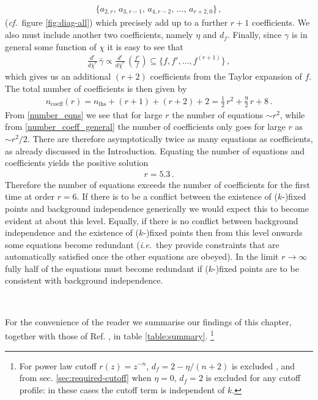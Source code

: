 \documentclass[11pt]{book} %
\newcommand\ie{\textit{i.e.}\ }
\newcommand\cf{\textit{cf.}\ }
\numberwithin{equation}{chapter}
\begin{document}
\begin{align}
  \bigg\lbrace
  a_{2,r},\, a_{3,r-1},\, a_{4,r-2},\, \dots,\, a_{r+2,0}
  \bigg\rbrace \,,
\end{align}
(\cf figure \ref{fig:diag-all}) which precisely add up to a further $r+1$ coefficients.
We also must include another two coefficients, namely $\eta$ and $d_f$.
Finally, since $\gamma$ is in general some function of $\chi$ it is easy to see that
\begin{align}
  \frac{d^r}{d \bar\chi^r} \, \bar{\gamma} \propto \frac{d^r}{d \bar\chi^r} \, \left( \frac{f'}{f}\right) \subseteq
  \bigg\lbrace f, f', \dots, f^{(r+1)}   \bigg\rbrace \,,
\end{align}
which gives us an additional $(r+2)$ coefficients from the Taylor expansion of $f$.
The total number of coefficients is then given by
\begin{align}
  \label{number_coeff_general}
  n_{\text{coeff}}(r) = n_{\text{lhs}} + (r+1) + (r+2) + 2  = \frac{1}{2} \, r^2 + \frac{9}{2} \, r + 8 \,.
\end{align}
From \eqref{number_eqns} we see that for large $r$ the number of equations $\sim r^2$,
while from \eqref{number_coeff_general} the number of coefficients only goes for large $r$ as $\sim r^2/2$.
There are therefore asymptotically twice as many equations as coefficients,
as already discussed in the Introduction.
Equating the number of equations and coefficients yields the positive solution
\begin{align}
  r = 5.3 \,.
\end{align}
Therefore the number of equations exceeds the number of coefficients for the first time at order $r=6$.
If there is to be a conflict between the existence of ($k$-)fixed points and background independence
generically we would expect this to become evident at about this level.
Equally, if there is no conflict between background independence and the existence of ($k$-)fixed points
then from this level onwards some equations become redundant
(\ie they provide constraints that are automatically satisfied once the other equations are obeyed).
In the limit $r\to\infty$ fully half of the equations must become redundant if ($k$-)fixed points are
to be consistent with background independence.

~

For the convenience of the reader we summarise our findings of this chapter,
together with those of Ref. \cite{Dietz:2015owa}, in table \ref{table:summary}.%
\footnote{
  For power law cutoff  $r(z)=z^{-n}$, $d_f = 2-\eta/(n+2)$ is excluded \cite{Dietz:2015owa},
  and from sec. \ref{sec:required-cutoff} when $\eta=0$,  $d_f=2$ is excluded for any cutoff profile:
  in these cases the cutoff term is independent of $k$.
}
\end{document}
